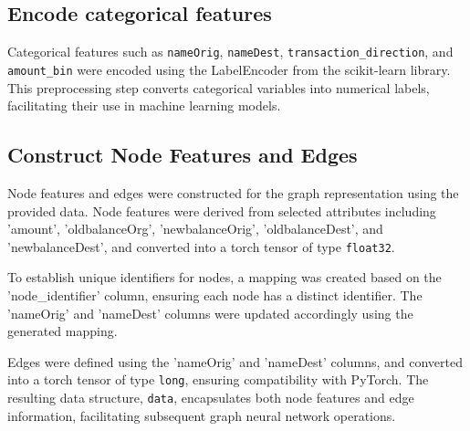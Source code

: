 \subsection{Encode categorical features}
\hspace{\parindent}
Categorical features such as \texttt{nameOrig}, \texttt{nameDest}, \texttt{transaction\_direction}, and \texttt{amount\_bin} were encoded using the LabelEncoder from the scikit-learn library. This preprocessing step converts categorical variables into numerical labels, facilitating their use in machine learning models.


\subsection{Construct Node Features and Edges}
\hspace{\parindent}
Node features and edges were constructed for the graph representation using the provided data. Node features were derived from selected attributes including 'amount', 'oldbalanceOrg', 'newbalanceOrig', 'oldbalanceDest', and 'newbalanceDest', and converted into a torch tensor of type \texttt{float32}.



To establish unique identifiers for nodes, a mapping was created based on the 'node\_identifier' column, ensuring each node has a distinct identifier. The 'nameOrig' and 'nameDest' columns were updated accordingly using the generated mapping.

Edges were defined using the 'nameOrig' and 'nameDest' columns, and converted into a torch tensor of type \texttt{long}, ensuring compatibility with PyTorch. The resulting data structure, \texttt{data}, encapsulates both node features and edge information, facilitating subsequent graph neural network operations.

